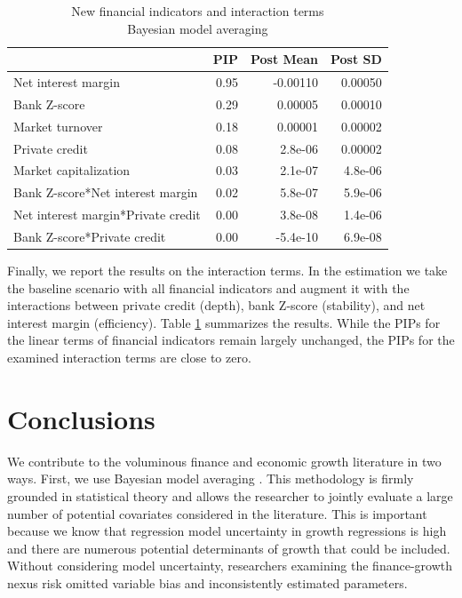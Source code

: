 \begin{refsection}
\begin{table}[!htbp]
	\centering
	\caption{New financial indicators and interaction terms\\
		Bayesian model averaging}
		\label{ch2fig:BMAint}
	\small
	\begin{tabular}{lrrr}
		\toprule
		& PIP & Post Mean & Post SD \\ 
		\midrule
		  Net interest margin & 0.95 & -0.00110 & 0.00050 \\
		  Bank Z-score & 0.29 & 0.00005 & 0.00010 \\
		  Market turnover & 0.18 & 0.00001 & 0.00002 \\
		  Private credit & 0.08 & 2.8e-06 & 0.00002 \\
		  Market capitalization & 0.03 & 2.1e-07 & 4.8e-06\\
		  Bank Z-score*Net interest margin & 0.02 & 5.8e-07 & 5.9e-06 \\
		  Net interest margin*Private credit & 0.00 & 3.8e-08 & 1.4e-06\\
		  Bank Z-score*Private credit & 0.00 &-5.4e-10 & 6.9e-08 \\
		\bottomrule
	\end{tabular}
\end{table}

Finally, we report the results on the interaction terms. In the estimation we take the baseline scenario with all financial indicators and augment it with the interactions between private credit (depth), bank Z-score (stability), and net interest margin (efficiency). Table \ref{ch2fig:BMAint} summarizes the results. While the \acp{PIP} for the linear terms of financial indicators remain largely unchanged, the \acp{PIP} for the examined interaction terms are close to zero.

\section{Conclusions}
\label{ch2sec:conclusions}
We contribute to the voluminous finance and economic growth literature in two ways. First, we use Bayesian model averaging \parencite{Rafteryetal1997}. This methodology is firmly grounded in statistical theory and allows the researcher to jointly evaluate a large number of potential covariates considered in the literature. This is important because we know that regression model uncertainty in growth regressions is high \parencite{SalaiMartinetal2004,Durlaufetal2008} and there are numerous potential determinants of growth that could be included. Without considering model uncertainty, researchers examining the finance-growth nexus risk omitted variable bias and inconsistently estimated parameters. 


\end{refsection}
